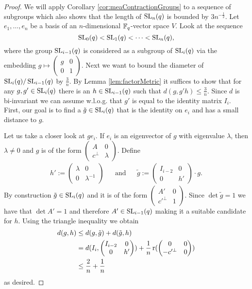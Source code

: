 \begin{proof}
	We will apply Corollary \ref{cor:meaContractionGroups} to a sequence of subgroups which also shows that the length of  $\operatorname{SL}_n(q)$ is bounded by $3n^{-\frac{1}{2}}$.
	Let $e_1,\dots,e_n$ be a basis of an $n$-dimensional $\mathbb{F}_q$-vector space $V$. Look at the sequence
	\[\operatorname{SL}_0(q)<\operatorname{SL}_1(q)<\dots<\operatorname{SL}_n(q),\]
	where the group $\operatorname{SL}_{i-1}(q)$ is considered as a subgroup of $\operatorname{SL}_i(q)$ via the embedding $g\mapsto 
	\begin{pmatrix}
		g & 0 \\
		0 & 1 
	\end{pmatrix}$. Next we want to bound the diameter of $\operatorname{SL}_{i}(q)/\operatorname{SL}_{i-1}(q)$ by $\frac{3}{n}$. By Lemma \ref{lem:factorMetric} it suffices to show that for any $g,g'\in\operatorname{SL}_i(q)$ there is an $h\in \operatorname{SL}_{i-1}(q)$ such that $d(g,g'h)\leq\frac{3}{n}$. Since $d$ is bi-invariant we can assume w.l.o.g. that $g'$ is equal to the identity matrix $I_i$. 
	First, our goal is to find a $\tilde g\in\operatorname{SL}_i(q)$ that is the identity on $e_i$ and has a small distance to $g$.
				
	Let us take a closer look at $ge_i$. If $e_i$ is an eigenvector of $g$ with eigenvalue $\lambda$, then $\lambda\not=0$ and $g$ is of the form 
	$\begin{pmatrix}
		A      & 0       \\
		c^\bot & \lambda 
	\end{pmatrix}$.
	Define 
	\begin{align*}
		h':=
		\begin{pmatrix}
			\lambda & 0            \\
			0       & \lambda^{-1} 
		\end{pmatrix}
		&&\text{and}&&\tilde g:=
		\begin{pmatrix}
			I_{i-2} & 0  \\
			0       & h' 
		\end{pmatrix}\cdot g.
	\end{align*}
	By construction $\tilde g\in\operatorname{SL}_i(q)$ and it is of the form 
	$\begin{pmatrix}
		A'      & 0 \\
		c'^\bot & 1 
	\end{pmatrix}$. Since $\det \tilde g=1$ we have that $\det A'=1$ and therefore $A'\in\operatorname{SL}_{i-1}(q)$ making it a suitable candidate for $h$. Using the triangle inequality we obtain
	\begin{align*}
		d(g,h)   & \leq d(g,\tilde g)+d(\tilde g,h)          \\
		         & =d(I_i,\begin{pmatrix}        
		I_{i-2}  & 0                             \\
		0        & h'                            
		\end{pmatrix})+\frac{1}{n}\operatorname{r}(\begin{pmatrix}
		0        & 0                             \\
		-c'^\bot & 0                             
		\end{pmatrix})\\
		         & \leq \frac{2}{n}+ \frac{1}{n} 
	\end{align*}
	as desired.
				

\end{proof}
